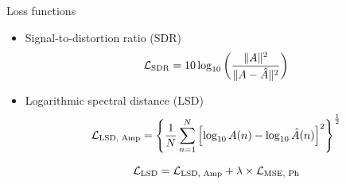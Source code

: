\documentclass{beamer}
\begin{document}
\begin{frame}[t]{Loss functions}

    \begin{itemize}
        \item Signal-to-distortion ratio (SDR) \cite{roux_sdr_2018}
            \begin{equation}
                \centering
                \mathcal{L}_{\text{SDR}} = 10 \log_{10} \left( \frac{\|A\|^2}{\|A - \hat{A}\|^2} \right)
                \label{sdr equation}
            \end{equation}

        \vspace{1.5\baselineskip}
        
        \item Logarithmic spectral distance (LSD) \cite{braun_consolidated_2020}
            \begin{equation}
                \centering
                \mathcal{L}_{\text{LSD, Amp}} = \left\{ \frac{1}{N} \sum_{n=1}^{N} \left[ \log_{10} A(n) - \log_{10} \hat{A}(n) \right]^2 \right\}^{\frac{1}{2}}
                \label{final lsd equation}
            \end{equation}

            \vspace{0.3\baselineskip}

            \begin{equation}
                \centering
                \mathcal{L}_{\text{LSD}} = \mathcal{L}_{\text{LSD, Amp}} + \lambda \times \mathcal{L}_{\text{MSE, Ph}}
            \end{equation}
    \end{itemize}
    
\end{frame}
\end{document}
